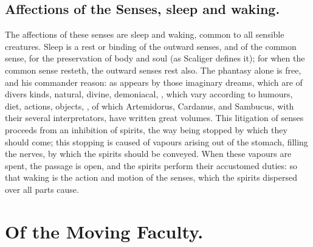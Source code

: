 {\subsection[Affections of the Senses]{Affections of the Senses, sleep and waking.}
The affections of these senses are sleep and waking, common to all sensible creatures. Sleep is
a rest or binding of the outward senses, and of the common sense, for
the preservation of body and soul (as Scaliger defines it); for
when the common sense resteth, the outward senses rest also. The
phantasy alone is free, and his commander reason: as appears by those
imaginary dreams, which are of divers kinds, natural, divine,
demoniacal, \etc{}, which vary according to humours, diet, actions,
objects, \etc{}, of which Artemidorus, Cardanus, and Sambucus, with their
several interpretators, have written great volumes. This litigation of
senses proceeds from an inhibition of spirits, the way being stopped by
which they should come; this stopping is caused of vapours arising out
of the stomach, filling the nerves, by which the spirits should be
conveyed. When these vapours are spent, the passage is open, and the
spirits perform their accustomed duties: so that waking is the action
and motion of the senses, which the spirits dispersed over all parts
cause.

\section{Of the Moving Faculty.}

}
